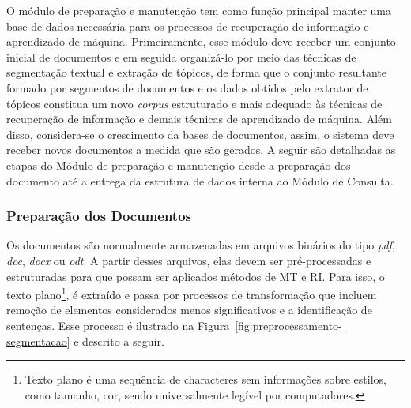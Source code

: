 O módulo de preparação e manutenção tem como função principal manter uma base de dados necessária para os processos de recuperação de informação e aprendizado de máquina. Primeiramente, esse módulo deve receber um conjunto inicial de documentos e em seguida organizá-lo por meio das técnicas de segmentação textual e extração de tópicos, de forma que o conjunto resultante formado por segmentos de documentos e os dados obtidos pelo extrator de tópicos constitua um novo \textit{corpus} estruturado e mais adequado às técnicas de recuperação de informação e demais técnicas de aprendizado de máquina. Além disso, considera-se o crescimento da bases de documentos, assim, o sistema deve receber novos documentos a medida que são gerados. A seguir são detalhadas as etapas do Módulo de preparação e manutenção desde a preparação dos documento até a entrega da estrutura de dados interna ao Módulo de Consulta. 







\subsubsection{Preparação dos Documentos}


Os documentos são normalmente armazenadas em arquivos binários do tipo \textit{pdf}, \textit{doc}, \textit{docx} ou \textit{odt}. A partir desses arquivos, elas devem ser pré-processadas e estruturadas para que possam ser aplicados métodos de MT e RI. Para isso, o texto plano\footnote{Texto plano é uma sequência de characteres sem informações sobre estilos, como tamanho, cor, sendo universalmente legível por computadores.}, é extraído e passa por processos de transformação que incluem remoção de elementos considerados menos significativos e a identificação de sentenças. Esse processo é ilustrado na Figura~\ref{fig:preprocessamento-segmentacao} e descrito a seguir.


